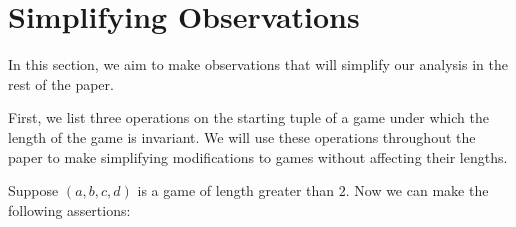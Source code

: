 \documentclass[12pt]{amsart}
\newtheorem{definition}[theorem]{Definition}
\newcommand{\breathe}{\vspace{0.2cm}}
\newcommand{\znn}{\mathbb{N}}
\begin{document}
%
%
%
%
%

\section{Simplifying Observations\label{sec:invariants}}

In this section, we aim to make observations that will simplify our analysis in the rest of the paper.

First, we list three operations on the starting tuple of a game under which the length of the game is invariant. We will use these operations throughout the paper to make simplifying modifications to games without affecting their lengths.

Suppose $(a,b,c,d)$ is a game of length greater than $2$. Now we can make the following assertions:
\end{document}
